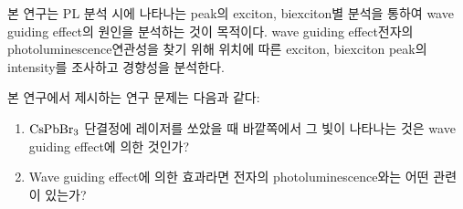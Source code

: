 본 연구는 PL 분석 시에 나타나는 peak의 exciton, biexciton별 분석을 통하여 wave guiding effect의 원인을 분석하는 것이 목적이다. wave guiding effect\와 전자의 photoluminescence 연관성을 찾기 위해 위치에 따른 exciton, biexciton peak의 intensity를 조사하고 경향성을 분석한다.

본 연구에서 제시하는 연구 문제는 다음과 같다:
\begin{enumerate}
	\item $\rm CsPbBr_3$ 단결정에 레이저를 쏘았을 때 바깥쪽에서 그 빛이 나타나는 것은 wave guiding effect에 의한 것인가?
	\item Wave guiding effect에 의한 효과라면 전자의 photoluminescence와는 어떤 관련이 있는가? 
\end{enumerate}

